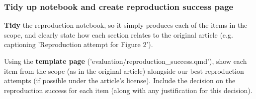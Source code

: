 \subsubsection{Tidy up notebook and create reproduction success page}

\textbf{Tidy} the reproduction notebook, so it simply produces each of the items in the scope, and clearly state how each section relates to the original article (e.g. captioning 'Reproduction attempt for Figure 2').

Using the \textbf{template page} ('evaluation/reproduction\_success.qmd'),\autocite{heather_template_2024} show each item from the scope (as in the original article) alongside our best reproduction attempts (if possible under the article's license). Include the decision on the reproduction success for each item (along with any justification for this decision).